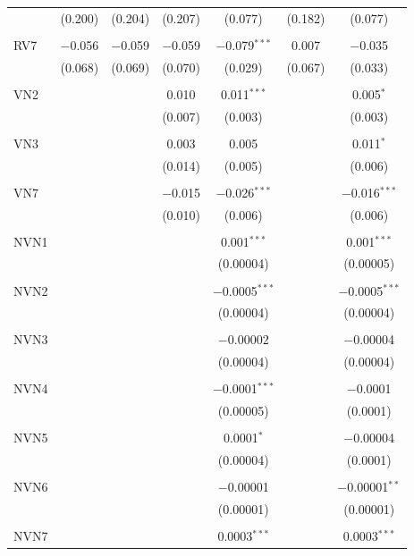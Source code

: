 \begin{table}[!htbp]
\begin{tabular}{@{\extracolsep{5pt}}lcccccc}
  & (0.200) & (0.204) & (0.207) & (0.077) & (0.182) & (0.077) \\ 
  & & & & & & \\ 
 RV7 & $-$0.056 & $-$0.059 & $-$0.059 & $-$0.079$^{***}$ & 0.007 & $-$0.035 \\ 
  & (0.068) & (0.069) & (0.070) & (0.029) & (0.067) & (0.033) \\ 
  & & & & & & \\ 
 VN2 &  &  & 0.010 & 0.011$^{***}$ &  & 0.005$^{*}$ \\ 
  &  &  & (0.007) & (0.003) &  & (0.003) \\ 
  & & & & & & \\ 
 VN3 &  &  & 0.003 & 0.005 &  & 0.011$^{*}$ \\ 
  &  &  & (0.014) & (0.005) &  & (0.006) \\ 
  & & & & & & \\ 
 VN7 &  &  & $-$0.015 & $-$0.026$^{***}$ &  & $-$0.016$^{***}$ \\ 
  &  &  & (0.010) & (0.006) &  & (0.006) \\ 
  & & & & & & \\ 
 NVN1 &  &  &  & 0.001$^{***}$ &  & 0.001$^{***}$ \\ 
  &  &  &  & (0.00004) &  & (0.00005) \\ 
  & & & & & & \\ 
 NVN2 &  &  &  & $-$0.0005$^{***}$ &  & $-$0.0005$^{***}$ \\ 
  &  &  &  & (0.00004) &  & (0.00004) \\ 
  & & & & & & \\ 
 NVN3 &  &  &  & $-$0.00002 &  & $-$0.00004 \\ 
  &  &  &  & (0.00004) &  & (0.00004) \\ 
  & & & & & & \\ 
 NVN4 &  &  &  & $-$0.0001$^{***}$ &  & $-$0.0001 \\ 
  &  &  &  & (0.00005) &  & (0.0001) \\ 
  & & & & & & \\ 
 NVN5 &  &  &  & 0.0001$^{*}$ &  & $-$0.00004 \\ 
  &  &  &  & (0.00004) &  & (0.0001) \\ 
  & & & & & & \\ 
 NVN6 &  &  &  & $-$0.00001 &  & $-$0.00001$^{**}$ \\ 
  &  &  &  & (0.00001) &  & (0.00001) \\ 
  & & & & & & \\ 
 NVN7 &  &  &  & 0.0003$^{***}$ &  & 0.0003$^{***}$ \\ 

\end{tabular}
\end{table}
